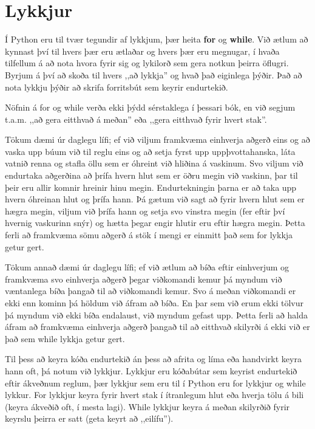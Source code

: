 
\chapter{Lykkjur}\label{k:lykkjur}

Í Python eru til tvær tegundir af lykkjum, þær heita \textbf{for} og \textbf{while}.
Við ætlum að kynnast því til hvers þær eru ætlaðar og hvers þær eru megnugar, í hvaða tilfellum á að nota hvora fyrir sig og lykilorð sem gera notkun þeirra öflugri.
Byrjum á því að skoða til hvers ,,að lykkja'' og hvað það eiginlega þýðir.
Það að nota lykkju þýðir að skrifa forritsbút sem keyrir endurtekið.

Nöfnin á for og while verða ekki þýdd sérstaklega í þessari bók, en við segjum t.a.m. ,,að gera eitthvað á meðan'' eða ,,gera eitthvað fyrir hvert stak''.

Tökum dæmi úr daglegu lífi; ef við viljum framkvæma einhverja aðgerð eins og að vaska upp búum við til reglu eins og að setja fyrst upp uppþvottahanska, láta vatnið renna og stafla öllu sem er óhreint við hliðina á vaskinum. 
Svo viljum við endurtaka aðgerðina að þrífa hvern hlut sem er öðru megin við vaskinn, þar til þeir eru allir komnir hreinir hinu megin.
Endurtekningin þarna er að taka upp hvern óhreinan hlut og þrífa hann.
Þá gætum við sagt að fyrir hvern hlut sem er hægra megin, viljum við þrífa hann og setja svo vinstra megin (fer eftir því hvernig vaskurinn snýr) og hætta þegar engir hlutir eru eftir hægra megin.
Þetta ferli að framkvæma sömu aðgerð á stök í mengi er einmitt það sem for lykkja getur gert.

Tökum annað dæmi úr daglegu lífi; ef við ætlum að bíða eftir einhverjum og framkvæma svo einhverja aðgerð þegar viðkomandi kemur þá myndum við væntanlega bíða þangað til að viðkomandi kemur.
Svo á meðan viðkomandi er ekki enn kominn þá höldum við áfram að bíða.
En þar sem við erum ekki tölvur þá myndum við ekki bíða endalaust, við myndum gefast upp.
Þetta ferli að halda áfram að framkvæma einhverja aðgerð þangað til að eitthvað skilyrði á ekki við er það sem while lykkja getur gert.

Til þess að keyra kóða endurtekið án þess að afrita og líma eða handvirkt keyra hann oft, þá notum við lykkjur.
Lykkjur eru kóðabútar sem keyrist endurtekið eftir ákveðnum reglum, þær lykkjur sem eru til í Python eru for lykkjur og while lykkur.
For lykkjur keyra fyrir hvert stak í ítranlegum hlut eða hverja tölu á bili (keyra ákveðið oft, í mesta lagi).
While lykkjur keyra á meðan skilyrðið fyrir keyrslu þeirra er satt (geta keyrt að ,,eilífu'').

